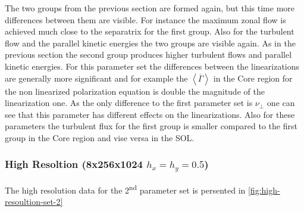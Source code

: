 \documentclass[master.tex]{subfiles}
\begin{document}
The two groups from the previous section are formed again, but this time more differences between them are visible. For instance the maximum zonal flow is achieved much close to the separatrix for the first group.\newline
Also for the turbulent flow and the parallel kinetic energies the two groups are visible again. As in the previous section the second group produces higher turbulent flows and parallel kinetic energies.\newline
For this parameter set the differences between the linearizations are generally more significant and for example the $\left< \overline{\Gamma} \right>$ in the Core region for the non linearized polarization equation is double the magnitude of the linearization one. As the only difference to the first parameter set is $\nu_\perp$ one can see that this parameter has different effects on the linearizations.\newline
Also for these parameters the turbulent flux for the first group is smaller compared to the first group in the Core region and vise versa in the \ac{SOL}.


\subsubsection{High Resoltion (8x256x1024 $h_x = h_y = 0.5$)}

The high resolution data for the 2\textsuperscript{nd} parameter set is persented in \autoref{fig:high-resoultion-set-2}
\end{document}
